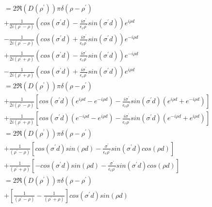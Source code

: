 \documentclass[11pt, oneside]{article}   	%
\begin{document}
\begin{align*}
 & =2\Re\left(D\left(\rho^{\prime}\right)\right)\pi\delta\left(\rho-\rho^{\prime}\right)\\
 & +\frac{1}{2i\left(\rho^{\prime}-\rho\right)}\left(cos\left(\sigma^{\prime}d\right)-\frac{i\sigma^{\prime}}{\epsilon_{r}\rho^{\prime}}sin\left(\sigma^{\prime}d\right)\right)e^{i\rho d}\\
 & -\frac{1}{2i\left(\rho^{\prime}-\rho\right)}\left(cos\left(\sigma^{\prime}d\right)+\frac{i\sigma^{\prime}}{\epsilon_{r}\rho^{\prime}}sin\left(\sigma^{\prime}d\right)\right)e^{-i\rho d}\\
 & +\frac{1}{2i\left(\rho^{\prime}+\rho\right)}\left(cos\left(\sigma^{\prime}d\right)-\frac{i\sigma^{\prime}}{\epsilon_{r}\rho^{\prime}}sin\left(\sigma^{\prime}d\right)\right)e^{-i\rho d}\\
 & -\frac{1}{2i\left(\rho^{\prime}+\rho\right)}\left(cos\left(\sigma^{\prime}d\right)+\frac{i\sigma^{\prime}}{\epsilon_{r}\rho^{\prime}}sin\left(\sigma^{\prime}d\right)\right)e^{i\rho d}\\
 & =2\Re\left(D\left(\rho^{\prime}\right)\right)\pi\delta\left(\rho-\rho^{\prime}\right)\\
 & +\frac{1}{2i\left(\rho^{\prime}-\rho\right)}\left[cos\left(\sigma^{\prime}d\right)\left(e^{i\rho d}-e^{-i\rho d}\right)-\frac{i\sigma^{\prime}}{\epsilon_{r}\rho^{\prime}}sin\left(\sigma^{\prime}d\right)\left(e^{i\rho d}+e^{-i\rho d}\right)\right]\\
 & +\frac{1}{2i\left(\rho^{\prime}+\rho\right)}\left[cos\left(\sigma^{\prime}d\right)\left(e^{-i\rho d}-e^{i\rho d}\right)-\frac{i\sigma^{\prime}}{\epsilon_{r}\rho^{\prime}}sin\left(\sigma^{\prime}d\right)\left(e^{-i\rho d}+e^{i\rho d}\right)\right]\\
 & =2\Re\left(D\left(\rho^{\prime}\right)\right)\pi\delta\left(\rho-\rho^{\prime}\right)\\
 & +\frac{1}{\left(\rho^{\prime}-\rho\right)}\left[cos\left(\sigma^{\prime}d\right)sin\left(\rho d\right)-\frac{\sigma^{\prime}}{\epsilon_{r}\rho^{\prime}}sin\left(\sigma^{\prime}d\right)cos\left(\rho d\right)\right]\\
 & +\frac{1}{\left(\rho^{\prime}+\rho\right)}\left[-cos\left(\sigma^{\prime}d\right)sin\left(\rho d\right)-\frac{\sigma^{\prime}}{\epsilon_{r}\rho^{\prime}}sin\left(\sigma^{\prime}d\right)cos\left(\rho d\right)\right]\\
 & =2\Re\left(D\left(\rho^{\prime}\right)\right)\pi\delta\left(\rho-\rho^{\prime}\right)\\
 & +\left[\frac{1}{\left(\rho^{\prime}-\rho\right)}-\frac{1}{\left(\rho^{\prime}+\rho\right)}\right]cos\left(\sigma^{\prime}d\right)sin\left(\rho d\right)\\

\end{align*}
\end{document}
